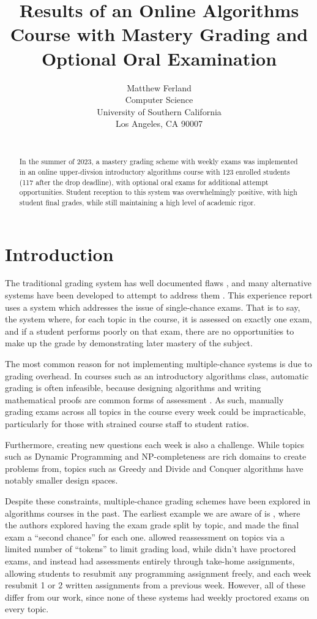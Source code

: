 \documentclass{article}
\title{Results of an Online Algorithms Course with Mastery Grading and Optional Oral Examination}
\author{
Matthew Ferland\\
Computer Science\\
University of Southern California\\
Los Angeles, CA 90007\\
\email{mferland@usc.edu}\\
}
\begin{document}
\maketitle

\begin{abstract}
In the summer of 2023, a mastery grading scheme with weekly exams was implemented in an online upper-divsion introductory algorithms course with 123 enrolled students (117 after the drop deadline), with optional oral exams for additional attempt opportunities. Student reception to this system was overwhelmingly positive, with high student final grades, while still maintaining a high level of academic rigor.
\end{abstract}

\section{Introduction}
The traditional grading system has well documented flaws \cite{iamarino2014benefits, link2019traditional}, and many alternative systems have been developed to attempt to address them \cite{cooper2020techniques, feldman2023grading, nilson2015specifications}. This experience report uses a system which addresses the issue of single-chance exams. That is to say, the system where, for each topic in the course, it is assessed on exactly one exam, and if a student performs poorly on that exam, there are no opportunities to make up the grade by demonstrating later mastery of the subject.

The most common reason for not implementing multiple-chance systems is due to grading overhead. In courses such as an introductory algorithms class, automatic grading is often infeasible, because designing algorithms and writing mathematical proofs are common forms of assessment \cite{luu2023algorithms}. As such, manually grading exams across all topics in the course every week could be impracticable, particularly for those with strained course staff to student ratios.

Furthermore, creating new questions each week is also a challenge. While topics such as Dynamic Programming and NP-completeness are rich domains to create problems from, topics such as Greedy and Divide and Conquer algorithms have notably smaller design spaces.

Despite these constraints, multiple-chance grading schemes have been explored in algorithms courses in the past. The earliest example we are aware of is \cite{shindler2020experience}, where the authors explored having the exam grade split by topic, and made the final exam a ``second chance'' for each one. \cite{chen2022experience} allowed reassessment on topics via a limited number of ``tokens'' to limit grading load, while \cite{weber2023using} didn't have proctored exams, and instead had assessments entirely through take-home assignments, allowing students to resubmit any programming assignment freely, and each week resubmit 1 or 2 written assignments from a previous week. However, all of these differ from our work, since none of these systems had weekly proctored exams on every topic.
\end{document}
